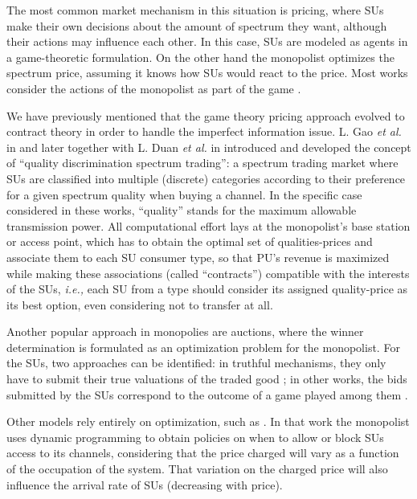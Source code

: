 The most common market mechanism in this situation is pricing, where SUs make their own decisions about the amount of spectrum they want, although their actions may influence each other. In this case, SUs are modeled as agents in a game-theoretic formulation. On the other hand the monopolist optimizes the spectrum price, assuming it knows how SUs would react to the price. Most works consider the actions of the monopolist as part of the game \cite{ref:Simeone2008,ref:Jayaweera2009,ref:Zhang2009,ref:Jayaweera2010,ref:Vazquez2010,ref:Yi2010}.

We have previously mentioned that the game theory pricing approach evolved to contract theory in order to handle the imperfect information issue. L. Gao \textit{et al.} in \cite{ref:Gao2011} and later together with L. Duan \textit{et al.} in \cite{ref:Duan2011_Contract} introduced and developed the concept of ``quality discrimination spectrum trading'': a spectrum trading market where SUs are classified into multiple (discrete) categories according to their preference for a given spectrum quality when buying a channel. In the specific case considered in these works, ``quality'' stands for the maximum allowable transmission power. All computational effort lays at the monopolist's base station or access point, which has to obtain the optimal set of qualities-prices and associate them to each SU consumer type, so that PU's revenue is maximized while making these associations (called ``contracts'') compatible with the interests of the SUs, \textit{i.e.,} each SU from a type should consider its assigned quality-price as its best option, even considering not to transfer at all.

Another popular approach in monopolies are auctions, \cite{ref:Huang2006,ref:Zhou2008,ref:Huang2008_auc,ref:Wang2010_Spec,ref:Gopinathan2011,ref:Zhu2012,ref:Jia2009_Rev} where the winner determination is formulated as an optimization problem for the monopolist. For the SUs, two approaches can be identified: in truthful mechanisms, they only have to submit their true valuations of the traded good \cite{ref:Zhou2008,ref:Gopinathan2011,ref:Zhu2012,ref:Jia2009_Rev}; in other works, the bids submitted by the SUs correspond to the outcome of a game played among them \cite{ref:Huang2006,ref:Huang2008_auc}.

Other models rely entirely on optimization, such as \cite{ref:Mutlu2008}. In that work the monopolist uses dynamic programming to obtain policies on when to allow or block SUs access to its channels, considering that the price charged will vary as a function of the occupation of the system. That variation on the charged price will also influence the arrival rate of SUs (decreasing with price).

